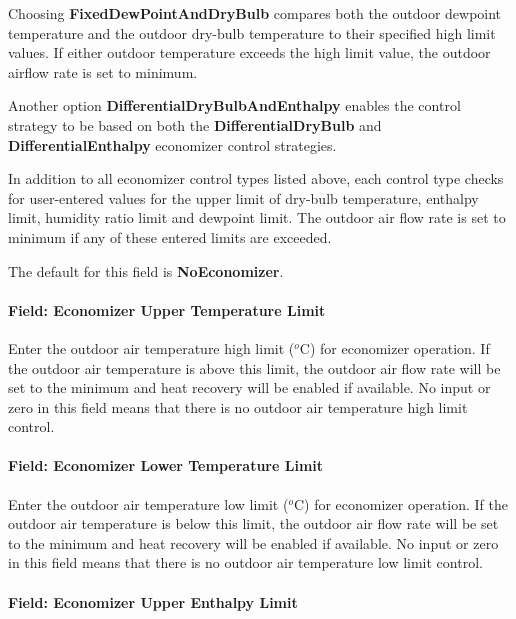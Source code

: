 Choosing \textbf{FixedDewPointAndDryBulb} compares both the outdoor dewpoint temperature and the outdoor dry-bulb temperature to their specified high limit values. If either outdoor temperature exceeds the high limit value, the outdoor airflow rate is set to minimum.

Another option \textbf{DifferentialDryBulbAndEnthalpy} enables the control strategy to be based on both the \textbf{DifferentialDryBulb} and \textbf{DifferentialEnthalpy} economizer control strategies.

In addition to all economizer control types listed above, each control type checks for user-entered values for the upper limit of dry-bulb temperature, enthalpy limit, humidity ratio limit and dewpoint limit. The outdoor air flow rate is set to minimum if any of these entered limits are exceeded.

The default for this field is \textbf{NoEconomizer}.

\paragraph{Field: Economizer Upper Temperature Limit}\label{field-economizer-upper-temperature-limit-2}

Enter the outdoor air temperature high limit (\(^{o}\)C) for economizer operation. If the outdoor air temperature is above this limit, the outdoor air flow rate will be set to the minimum and heat recovery will be enabled if available. No input or zero in this field means that there is no outdoor air temperature high limit control.

\paragraph{Field: Economizer Lower Temperature Limit}\label{field-economizer-lower-temperature-limit-2}

Enter the outdoor air temperature low limit (\(^{o}\)C) for economizer operation. If the outdoor air temperature is below this limit, the outdoor air flow rate will be set to the minimum and heat recovery will be enabled if available. No input or zero in this field means that there is no outdoor air temperature low limit control.

\paragraph{Field: Economizer Upper Enthalpy Limit}\label{field-economizer-upper-enthalpy-limit-2}

